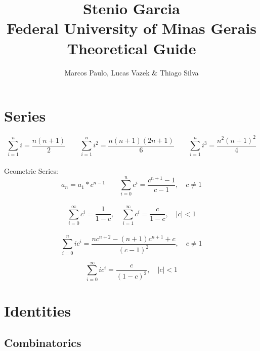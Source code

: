 \documentclass[10pt, twocolumn]{article}
\title{\textbf{Stenio Garcia\\Federal University of Minas Gerais\\Theoretical Guide}}
\author{Marcos Paulo, Lucas Vazek $\&$ Thiago Silva}
\date{}
\begin{document}
\maketitle
\pagestyle{fancy}
\fancyhf{}
\begin{flushleft}


\section{Series}

$$\sum_{i=1}^{n} i = \frac{n(n+1)}{2}  \qquad  \sum_{i=1}^{n} i^{2} = \frac{n(n+1)(2n+1)}{6}  \qquad  \sum_{i=1}^{n} i^{3} = \frac{n^{2}(n+1)^{2}}{4}$$\\

Geometric Series:\\

$$a_n = a_1*c^{n-1} \qquad \sum_{i=0}^{n} c^{i} = \frac{c^{n+1}-1}{c-1}, \quad c \neq 1$$\\

$$\sum_{i=0}^{\infty} c^{i} = \frac{1}{1-c}, \quad \sum_{i=1}^{\infty} c^{i} = \frac{c}{1-c}, \quad |c| < 1$$\\

$$\sum_{i=0}^{n} ic^{i} = \frac{nc^{n+2} - (n+1)c^{n+1} + c}{(c-1)^{2}}, \quad c \neq 1$$

$$\sum_{i=0}^{\infty} ic^{i} = \frac{c}{(1-c)^{2}}, \quad |c| < 1$$



\vspace{50px}

\section{Identities}

\subsection{Combinatorics}


\end{flushleft}
\end{document}

